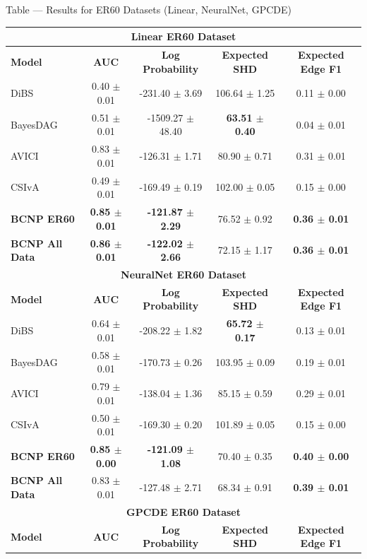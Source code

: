 \documentclass[aspectratio=169,10pt]{beamer}
\begin{document}
\begin{frame}{Table --- Results for ER60 Datasets (Linear, NeuralNet, GPCDE)}
\scriptsize
\begin{tabular}{lcccc}
\toprule
\multicolumn{5}{c}{\textbf{Linear ER60 Dataset}} \\
\midrule
\textbf{Model} & \textbf{AUC} & \textbf{Log Probability} & \textbf{Expected SHD} & \textbf{Expected Edge F1} \\
\midrule
DiBS & 0.40 $\pm$ 0.01 & -231.40 $\pm$ 3.69 & 106.64 $\pm$ 1.25 & 0.11 $\pm$ 0.00 \\
BayesDAG & 0.51 $\pm$ 0.01 & -1509.27 $\pm$ 48.40 & \textbf{63.51 $\pm$ 0.40} & 0.04 $\pm$ 0.01 \\
AVICI & 0.83 $\pm$ 0.01 & -126.31 $\pm$ 1.71 & 80.90 $\pm$ 0.71 & 0.31 $\pm$ 0.01 \\
CSIvA & 0.49 $\pm$ 0.01 & -169.49 $\pm$ 0.19 & 102.00 $\pm$ 0.05 & 0.15 $\pm$ 0.00 \\
\textbf{BCNP ER60} & \textbf{0.85 $\pm$ 0.01} & \textbf{-121.87 $\pm$ 2.29} & 76.52 $\pm$ 0.92 & \textbf{0.36 $\pm$ 0.01} \\
\textbf{BCNP All Data} & \textbf{0.86 $\pm$ 0.01} & \textbf{-122.02 $\pm$ 2.66} & 72.15 $\pm$ 1.17 & \textbf{0.36 $\pm$ 0.01}\\
\midrule
\multicolumn{5}{c}{\textbf{NeuralNet ER60 Dataset}} \\
\midrule
\textbf{Model} & \textbf{AUC} & \textbf{Log Probability} & \textbf{Expected SHD} & \textbf{Expected Edge F1} \\
\midrule
DiBS & 0.64 $\pm$ 0.01 & -208.22 $\pm$ 1.82 & \textbf{65.72 $\pm$ 0.17} & 0.13 $\pm$ 0.01 \\
BayesDAG & 0.58 $\pm$ 0.01 & -170.73 $\pm$ 0.26 & 103.95 $\pm$ 0.09 & 0.19 $\pm$ 0.01 \\
AVICI & 0.79 $\pm$ 0.01 & -138.04 $\pm$ 1.36 & 85.15 $\pm$ 0.59 & 0.29 $\pm$ 0.01 \\
CSIvA & 0.50 $\pm$ 0.01 & -169.30 $\pm$ 0.20 & 101.89 $\pm$ 0.05 & 0.15 $\pm$ 0.00 \\
\textbf{BCNP ER60} & \textbf{0.85 $\pm$ 0.00} & \textbf{-121.09 $\pm$ 1.08} & 70.40 $\pm$ 0.35 & \textbf{0.40 $\pm$ 0.00} \\
\textbf{BCNP All Data} & 0.83 $\pm$ 0.01 & -127.48 $\pm$ 2.71 & 68.34 $\pm$ 0.91 & \textbf{0.39 $\pm$ 0.01} \\
\midrule
\multicolumn{5}{c}{\textbf{GPCDE ER60 Dataset}} \\
\midrule
\textbf{Model} & \textbf{AUC} & \textbf{Log Probability} & \textbf{Expected SHD} & \textbf{Expected Edge F1} \\

\end{tabular}
\end{frame}
\end{document}
